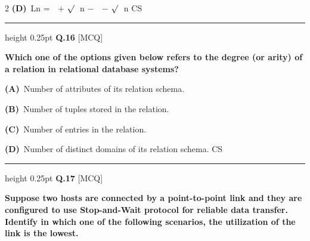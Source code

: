 \documentclass[a4paper,10pt,twoside]{article}
\begin{document}
\begin{multicols}{2}
\textbf{(D)}~Ln = \newline   + \newline $\sqrt{\vphantom{x}}$   \newline n \newline − \newline   − \newline $\sqrt{\vphantom{x}}$   \newline n \newline CS
\par\vspace{6pt}\hrule height 0.25pt\vspace{6pt}
\noindent\textbf{Q.16} \hfill {\footnotesize\textsf{[MCQ]}}
\par\vspace{2pt}
{\bfseries Which one of the options given below refers to the degree (or arity) of a relation in
relational database systems? \par}
\par\vspace{2pt}\noindent
\textbf{(A)}~Number of attributes of its relation schema.\par\vspace{2pt}\noindent
\textbf{(B)}~Number of tuples stored in the relation.\par\vspace{2pt}\noindent
\textbf{(C)}~Number of entries in the relation.\par\vspace{2pt}\noindent
\textbf{(D)}~Number of distinct domains of its relation schema. \newline CS
\par\vspace{6pt}\hrule height 0.25pt\vspace{6pt}
\noindent\textbf{Q.17} \hfill {\footnotesize\textsf{[MCQ]}}
\par\vspace{2pt}
{\bfseries Suppose two hosts are connected by a point-to-point link and they are conﬁgured
to use Stop-and-Wait protocol for reliable data transfer. Identify in which one of
the following scenarios, the utilization of the link is the lowest. \par}
\par\vspace{2pt}\noindent

\end{multicols}
\end{document}

